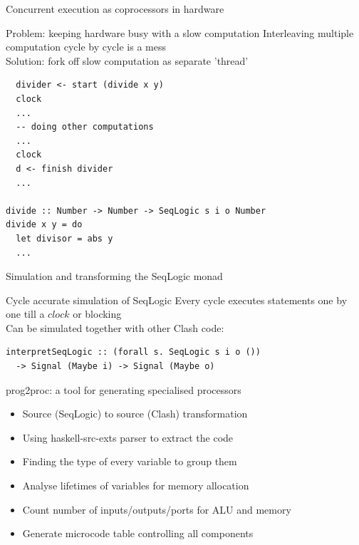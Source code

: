 \documentclass[pdf]{beamer}
\begin{document}

\begin{frame}[fragile]{Concurrent execution as coprocessors in hardware}
\begin{block}{Problem: keeping hardware busy with a slow computation}
Interleaving multiple computation cycle by cycle is a mess \\
Solution: fork off slow computation as separate 'thread'
\end{block}

\begin{block}{}
\begin{small}
\begin{verbatim}
  divider <- start (divide x y)
  clock
  ...
  -- doing other computations
  ...
  clock
  d <- finish divider
  ...

divide :: Number -> Number -> SeqLogic s i o Number
divide x y = do
  let divisor = abs y
  ...
\end{verbatim}
\end{small}
\end{block}

\end{frame}

\begin{frame}[fragile]{Simulation and transforming the SeqLogic monad}
\begin{block}{Cycle accurate simulation of SeqLogic}
Every cycle executes statements one by one till a $clock$ or blocking \\
Can be simulated together with other Clash code:
\begin{verbatim}
interpretSeqLogic :: (forall s. SeqLogic s i o ())
  -> Signal (Maybe i) -> Signal (Maybe o)
\end{verbatim}
\end{block}

\begin{block}{prog2proc: a tool for generating specialised processors}
\begin{itemize}
\item Source (SeqLogic) to source (Clash) transformation
\item Using haskell-src-exts parser to extract the code
\item Finding the type of every variable to group them
\item Analyse lifetimes of variables for memory allocation
\item Count number of inputs/outputs/ports for ALU and memory
\item Generate microcode table controlling all components
\end{itemize}
\end{block}

\end{frame}
\end{document}

